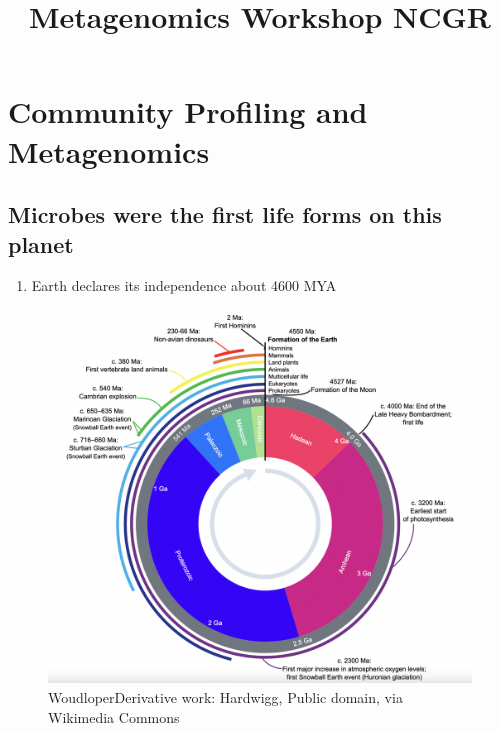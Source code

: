 \documentclass[
]{book}
\title{Metagenomics Workshop NCGR}
\author{}
\date{\vspace{-2.5em}}
\providecommand{\tightlist}{%
  \setlength{\itemsep}{0pt}\setlength{\parskip}{0pt}}
\begin{document}
\maketitle

{
\setcounter{tocdepth}{1}
\tableofcontents
}
\hypertarget{community-profiling-and-metagenomics}{%
\chapter{Community Profiling and Metagenomics}\label{community-profiling-and-metagenomics}}

\hypertarget{microbes-were-the-first-life-forms-on-this-planet}{%
\section{Microbes were the first life forms on this planet}\label{microbes-were-the-first-life-forms-on-this-planet}}

\begin{enumerate}
\def\labelenumi{\arabic{enumi}.}
\tightlist
\item
  Earth declares its independence about 4600 MYA
\end{enumerate}

\begin{figure}
\centering
\includegraphics[width=1\textwidth,height=\textheight]{./Figures/EarthHistory.png}
\caption{WoudloperDerivative work: Hardwigg, Public domain, via Wikimedia Commons}
\end{figure}
\end{document}
